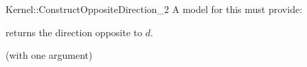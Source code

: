 \begin{ccRefFunctionObjectConcept}{Kernel::ConstructOppositeDirection_2}
A model for this must provide:


 {returns the direction opposite to $d$.}

\ccRefines
{} (with one argument)

\ccSeeAlso
{} \\

\end{ccRefFunctionObjectConcept}
